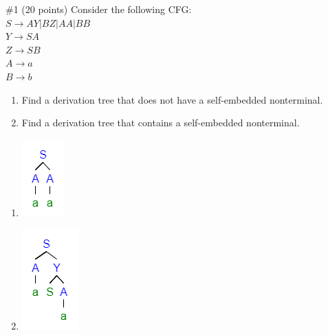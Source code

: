 \begin{problem}{\#1 (20 points)}
    Consider the following CFG:\\
    $S \to AY | BZ | AA | BB$\\
    $Y \to SA$\\
    $Z \to SB$\\
    $A \to a$\\
    $B \to b$
    \begin{enumerate}[label=\alph*)]
        \item Find a derivation tree that does not have a self-embedded nonterminal.
        \item Find a derivation tree that contains a self-embedded nonterminal.
    \end{enumerate}
\end{problem}
\begin{solution}
    \begin{enumerate}[label=\alph*)]
        \item \includegraphics[width=0.12\linewidth]{figures/answer1a.png}
        \item \includegraphics[width=0.15\linewidth]{figures/answer1b.png}
    \end{enumerate}
\end{solution}

